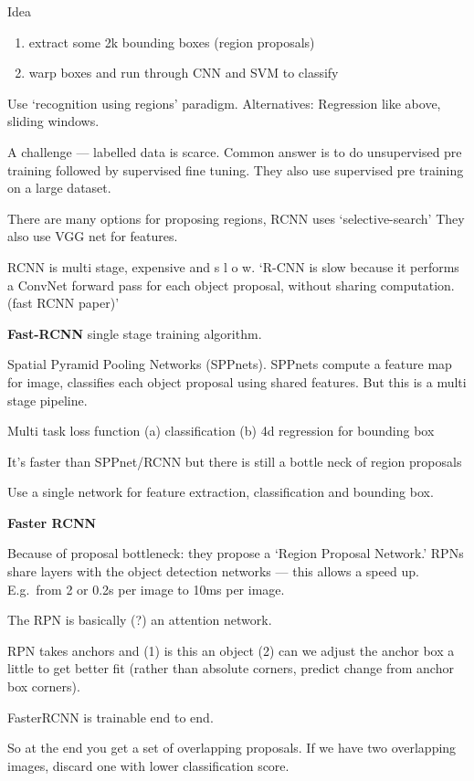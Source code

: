 \documentclass[12pt, a4paper, oneside, headinclude, footinclude]{article}
\begin{document}
Idea
\begin{enumerate}
    \item extract some 2k bounding boxes (region proposals)
    \item warp boxes and run through CNN and SVM to classify
\end{enumerate}

Use `recognition using regions' paradigm.
Alternatives: Regression like above, sliding windows.

A challenge --- labelled data is scarce. Common answer is to do unsupervised
pre training followed by supervised fine tuning. They also use supervised pre
training on a large dataset.

There are many options for proposing regions, RCNN uses `selective-search'
They also use VGG net for features.

RCNN is multi stage, expensive and s l o w. `R-CNN is slow because it performs
a ConvNet forward pass for each object proposal, without sharing computation.
(fast RCNN paper)'

\textbf{Fast-RCNN} single stage training algorithm. 

Spatial Pyramid Pooling Networks (SPPnets). SPPnets compute a feature map
for image, classifies each object proposal using shared features. But this is
a multi stage pipeline.

Multi task loss function
    (a) classification
    (b) 4d regression for bounding box

It's faster than SPPnet/RCNN but there is still a bottle neck of region
proposals

Use a single network for feature extraction, classification and bounding box.


\textbf{Faster RCNN}~\cite{Ren2017}

Because of proposal bottleneck: they propose a `Region Proposal Network.' RPNs
share layers with the object detection networks --- this allows a speed up.
E.g.\ from 2 or 0.2s per image to 10ms per image.

The RPN is basically (?) an attention network.

RPN takes anchors and (1) is this an object (2) can we adjust the anchor box
a little to get better fit (rather than absolute corners, predict change from
anchor box corners).

FasterRCNN is trainable end to end.

So at the end you get a set of overlapping proposals. If we have two
overlapping images, discard one with lower classification score.
\end{document}

